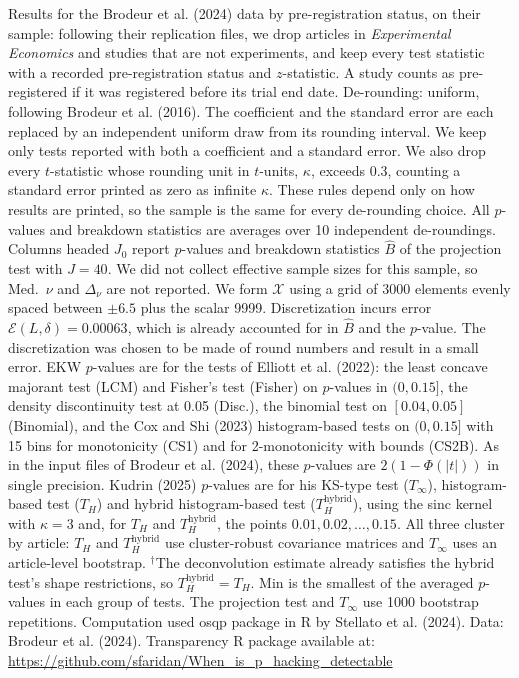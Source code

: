 \begin{table}[htbp]
\medskip
\begin{minipage}{\linewidth}
Results for the Brodeur et al. (2024) data by pre-registration status, on their sample: following their replication files, we drop articles in \textit{Experimental Economics} and studies that are not experiments, and keep every test statistic with a recorded pre-registration status and $z$-statistic.
A study counts as pre-registered if it was registered before its trial end date.
De-rounding: uniform, following Brodeur et al. (2016). The coefficient and the standard error are each replaced by an independent uniform draw from its rounding interval.
We keep only tests reported with both a coefficient and a standard error. We also drop every $t$-statistic whose rounding unit in $t$-units, $\kappa$, exceeds 0.3, counting a standard error printed as zero as infinite $\kappa$. These rules depend only on how results are printed, so the sample is the same for every de-rounding choice.
All $p$-values and breakdown statistics are averages over 10 independent de-roundings.
Columns headed $J_0$ report $p$-values and breakdown statistics $\widehat{B}$ of the projection test with $J=40$.
We did not collect effective sample sizes for this sample, so Med.\ $\nu$ and $\Delta_\nu$ are not reported.
We form $\mathcal{X}$ using a grid of 3000 elements evenly spaced between $\pm 6.5$ plus the scalar 9999.
Discretization incurs error $\mathcal{E}(L,\delta)=0.00063$, which is already accounted for in $\widehat{B}$ and the $p$-value.
The discretization was chosen to be made of round numbers and result in a small error.
EKW $p$-values are for the tests of Elliott et al. (2022): the least concave majorant test (LCM) and Fisher's test (Fisher) on $p$-values in $(0,0.15]$, the density discontinuity test at 0.05 (Disc.), the binomial test on $[0.04,0.05]$ (Binomial), and the Cox and Shi (2023) histogram-based tests on $(0,0.15]$ with 15 bins for monotonicity (CS1) and for 2-monotonicity with bounds (CS2B).
As in the input files of Brodeur et al. (2024), these $p$-values are $2(1-\Phi(|t|))$ in single precision.
Kudrin (2025) $p$-values are for his KS-type test ($T_\infty$), histogram-based test ($T_H$) and hybrid histogram-based test ($T_H^{\mathrm{hybrid}}$), using the sinc kernel with $\kappa=3$ and, for $T_H$ and $T_H^{\mathrm{hybrid}}$, the points $0.01,0.02,\ldots,0.15$.
All three cluster by article: $T_H$ and $T_H^{\mathrm{hybrid}}$ use cluster-robust covariance matrices and $T_\infty$ uses an article-level bootstrap.
$^\dagger$The deconvolution estimate already satisfies the hybrid test's shape restrictions, so $T_H^{\mathrm{hybrid}}=T_H$.
Min is the smallest of the averaged $p$-values in each group of tests.
The projection test and $T_\infty$ use 1000 bootstrap repetitions.
Computation used osqp package in R by Stellato et al. (2024). Data: Brodeur et al. (2024).
Transparency R package available at: \url{https://github.com/sfaridan/When_is_p_hacking_detectable}
\end{minipage}
\end{table}
